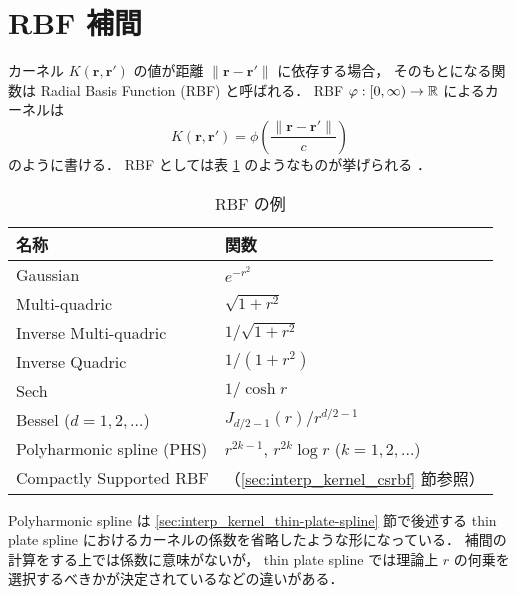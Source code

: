 %

\section{RBF 補間}\label{sec:interp_kernel_rbf}

カーネル $K(\bm{r}, \bm{r}')$ の値が距離 $\|\bm{r} - \bm{r}'\|$ に依存する場合，
そのもとになる関数は Radial Basis Function (RBF) と呼ばれる．
RBF $\varphi : [0, \infty) \to \mathbb{R}$ によるカーネルは
\begin{equation}
    K(\bm{r}, \bm{r}') = \phi\left(\frac{\|\bm{r} - \bm{r}'\|}{c}\right)
    \label{eq:regularization_kernel_kernel-of-rbf}
\end{equation}
のように書ける．
RBF としては表
\ref{table:interp_kernel_example-rbfs}
のようなものが挙げられる
\cite{Brochu2010,Fornberg2015}．

\begin{table}[bp]
    \caption{RBF の例 \cite{Brochu2010,Fornberg2015}}
    \label{table:interp_kernel_example-rbfs}
    \centering
    \begin{tabular}{ll}
        名称                        & 関数                                           \\
        \hline
        Gaussian                  & $e^{-r^2}$                                   \\
        Multi-quadric             & $\sqrt{1 + r^2}$                             \\
        Inverse Multi-quadric     & $1/\sqrt{1 + r^2}$                           \\
        Inverse Quadric           & $1 / (1 + r^2)$                              \\
        Sech                      & $1 / \cosh{r}$                               \\
        Bessel ($d=1,2,\ldots$)   & $J_{d/2-1}(r) / r^{d/2-1}$                   \\
        Polyharmonic spline (PHS) & $r^{2k-1}$, $r^{2k}\log{r}$ ($k=1,2,\ldots$) \\
        Compactly Supported RBF   & （\ref{sec:interp_kernel_csrbf} 節参照）
    \end{tabular}
\end{table}

Polyharmonic spline は
\ref{sec:interp_kernel_thin-plate-spline} 節で後述する
thin plate spline におけるカーネルの係数を省略したような形になっている．
補間の計算をする上では係数に意味がないが，
thin plate spline では理論上 $r$ の何乗を選択するべきかが決定されているなどの違いがある．

